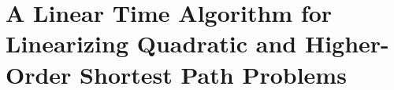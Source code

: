 \chapter{A Linear Time Algorithm for Linearizing Quadratic and Higher-Order Shortest Path Problems}
\label{ch:linearization-2}









